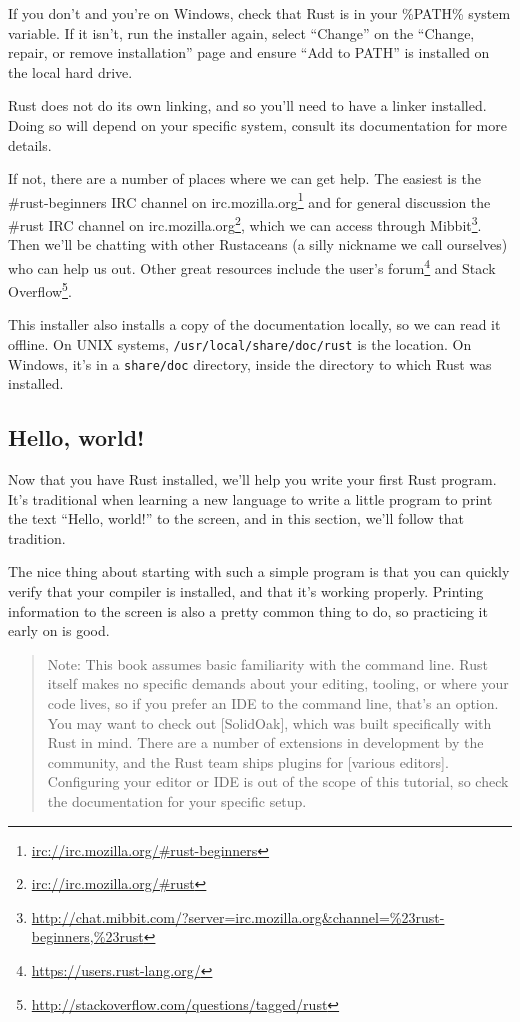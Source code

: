 \documentclass[a4paper,]{book}
\renewcommand{\href}[2]{#2\footnote{\url{#1}}}
\begin{document}
If you don't and you're on Windows, check that Rust is in your \%PATH\%
system variable. If it isn't, run the installer again, select ``Change''
on the ``Change, repair, or remove installation'' page and ensure ``Add
to PATH'' is installed on the local hard drive.

Rust does not do its own linking, and so you'll need to have a linker
installed. Doing so will depend on your specific system, consult its
documentation for more details.

If not, there are a number of places where we can get help. The easiest
is \href{irc://irc.mozilla.org/\#rust-beginners}{the \#rust-beginners
IRC channel on irc.mozilla.org} and for general discussion
\href{irc://irc.mozilla.org/\#rust}{the \#rust IRC channel on
irc.mozilla.org}, which we can access through
\href{http://chat.mibbit.com/?server=irc.mozilla.org\&channel=\%23rust-beginners,\%23rust}{Mibbit}.
Then we'll be chatting with other Rustaceans (a silly nickname we call
ourselves) who can help us out. Other great resources include
\href{https://users.rust-lang.org/}{the user's forum} and
\href{http://stackoverflow.com/questions/tagged/rust}{Stack Overflow}.

This installer also installs a copy of the documentation locally, so we
can read it offline. On UNIX systems, \texttt{/usr/local/share/doc/rust}
is the location. On Windows, it's in a \texttt{share/doc} directory,
inside the directory to which Rust was installed.

\subsection{Hello, world!}\label{hello-world}

Now that you have Rust installed, we'll help you write your first Rust
program. It's traditional when learning a new language to write a little
program to print the text ``Hello, world!'' to the screen, and in this
section, we'll follow that tradition.

The nice thing about starting with such a simple program is that you can
quickly verify that your compiler is installed, and that it's working
properly. Printing information to the screen is also a pretty common
thing to do, so practicing it early on is good.

\begin{quote}
Note: This book assumes basic familiarity with the command line. Rust
itself makes no specific demands about your editing, tooling, or where
your code lives, so if you prefer an IDE to the command line, that's an
option. You may want to check out {[}SolidOak{]}, which was built
specifically with Rust in mind. There are a number of extensions in
development by the community, and the Rust team ships plugins for
{[}various editors{]}. Configuring your editor or IDE is out of the
scope of this tutorial, so check the documentation for your specific
setup.
\end{quote}
\end{document}
